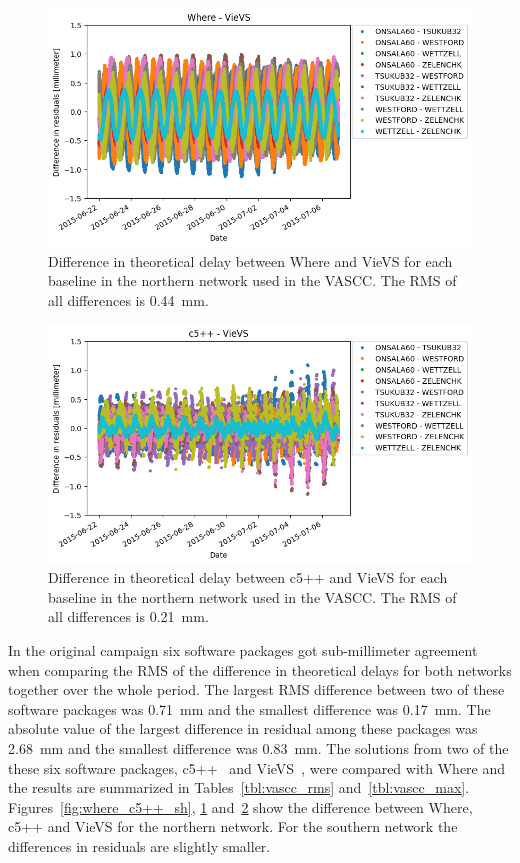 \documentclass[natbib,twocolumn,twoside]{svmultiag}
\begin{document}
\begin{figure}[tb]
  \includegraphics[width=\columnwidth]{kirkvik_fig04}
  \caption{Difference in theoretical delay between Where and VieVS for each
    baseline in the northern network used in the VASCC. The RMS of all
    differences is 0.44~mm.}
  \label{fig:where_vievs_sh}
\end{figure}

\begin{figure}[tb]
  \includegraphics[width=\columnwidth]{kirkvik_fig05}
  \caption{Difference in theoretical delay between c5++ and VieVS for each
    baseline in the northern network used in the VASCC. The RMS of all
    differences is 0.21~mm.}
  \label{fig:c5++_vievs_sh}
\end{figure}

In the original campaign six software packages got sub-millimeter agreement when
comparing the RMS of the difference in theoretical delays for both networks
together over the whole period. The largest RMS difference between two of these
software packages was 0.71~mm and the smallest difference was 0.17~mm. The
absolute value of the largest difference in residual among these packages was
2.68~mm and the smallest difference was 0.83~mm. The solutions from two of the
these six software packages, c5++~\citep{hobiger2010} and
VieVS~\citep{boehm2012}, were compared with Where and the results are summarized
in Tables~\ref{tbl:vascc_rms}
and~\ref{tbl:vascc_max}. Figures~\ref{fig:where_c5++_sh},
\ref{fig:where_vievs_sh} and~\ref{fig:c5++_vievs_sh} show the difference between
Where, c5++ and VieVS for the northern network. For the southern network the
differences in residuals are slightly smaller.
\end{document}

